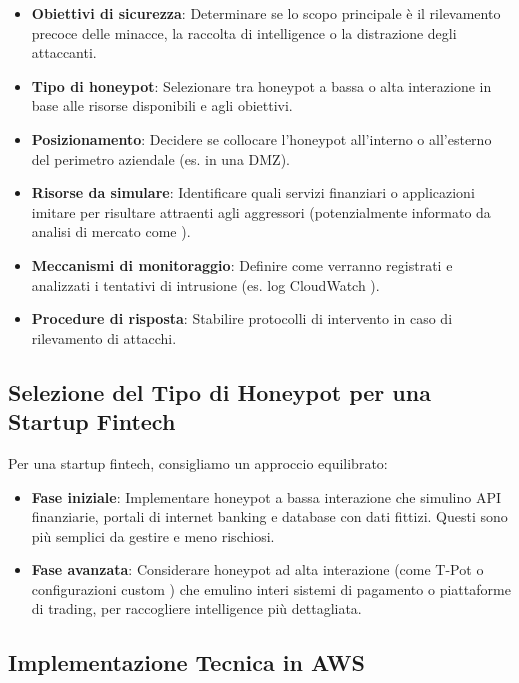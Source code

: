 \documentclass[a4paper,12pt]{report}
\begin{document}
\begin{itemize}
    \item \textbf{Obiettivi di sicurezza}: Determinare se lo scopo principale è il rilevamento precoce delle minacce, la raccolta di intelligence o la distrazione degli attaccanti.
    \item \textbf{Tipo di honeypot}: Selezionare tra honeypot a bassa o alta interazione in base alle risorse disponibili e agli obiettivi.
    \item \textbf{Posizionamento}: Decidere se collocare l'honeypot all'interno o all'esterno del perimetro aziendale (es. in una DMZ).
    \item \textbf{Risorse da simulare}: Identificare quali servizi finanziari o applicazioni imitare per risultare attraenti agli aggressori (potenzialmente informato da analisi di mercato come \cite{fricano2017}).
    \item \textbf{Meccanismi di monitoraggio}: Definire come verranno registrati e analizzati i tentativi di intrusione (es. log CloudWatch \cite{cloudwatch_pricing}).
    \item \textbf{Procedure di risposta}: Stabilire protocolli di intervento in caso di rilevamento di attacchi.
\end{itemize}

\subsection{Selezione del Tipo di Honeypot per una Startup Fintech}
\label{subsec:selezione_tipo}

Per una startup fintech, consigliamo un approccio equilibrato:

\begin{itemize}
    \item \textbf{Fase iniziale}: Implementare honeypot a bassa interazione che simulino API finanziarie, portali di internet banking e database con dati fittizi. Questi sono più semplici da gestire e meno rischiosi.
    \item \textbf{Fase avanzata}: Considerare honeypot ad alta interazione (come T-Pot \cite{zhang_2023} o configurazioni custom \cite{tsang_2022}) che emulino interi sistemi di pagamento o piattaforme di trading, per raccogliere intelligence più dettagliata.
\end{itemize}

\subsection{Implementazione Tecnica in AWS}
\label{subsec:implementazione_tecnica}
\end{document}
